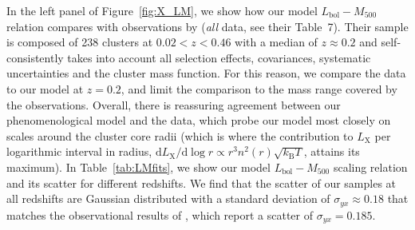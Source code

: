 \documentclass[traditabstract]{aa}
\newcommand{\rmn}{\mathrm}
\newcommand{\dd}{\mathrm{d}}
\begin{document}
In the left panel of Figure~\ref{fig:X_LM}, we show how our model
$L_{\rmn{bol}}-M_{500}$ relation compares with observations by
\cite{2010MNRAS.406.1773M} (\emph{all} data, see their Table~7). Their sample is
composed of 238 clusters at $0.02<z<0.46$ with a median of $z \approx 0.2$ and
self-consistently takes into account all selection effects, covariances,
systematic uncertainties and the cluster mass function. For this reason, we
compare the \cite{2010MNRAS.406.1773M} data to our model at $z=0.2$, and limit
the comparison to the mass range covered by the observations. Overall, there is
reassuring agreement between our phenomenological model and the data, which
probe our model most closely on scales around the cluster core radii (which is
where the contribution to $L_{\rmn{X}}$ per logarithmic interval in radius, $\dd
L_{\rmn{X}}/\dd\log r \propto r^3 n^2(r) \sqrt{k_{\rmn{B}}T}$, attains its maximum).  In
Table~\ref{tab:LMfits}, we show our model $L_{\rmn{bol}}-M_{500}$ scaling
relation and its scatter for different redshifts. We find that the scatter of
our samples at all redshifts are Gaussian distributed with a standard deviation
of $\sigma_{yx} \approx 0.18$ that matches the observational results of
\cite{2010MNRAS.406.1773M}, which report a scatter of $\sigma_{yx} = 0.185$.
\end{document}
